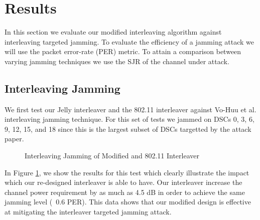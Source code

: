 \documentclass[sigconf]{acmart}
\begin{document}
\section{Results}
\label{sec:results}

In this section we evaluate our modified interleaving algorithm against interleaving targeted jamming. To evaluate the efficiency of a jamming attack we will use the packet error-rate (PER) metric. To attain a comparison between varying jamming techniques we use the SJR of the channel under attack.  

\subsection{Interleaving Jamming}

We first test our Jelly interleaver and the 802.11 interleaver against Vo-Huu et al. interleaving jamming technique. For this set of tests we jammed on DSCs 0, 3, 6, 9, 12, 15, and 18 since this is the largest subset of DSCs targetted by the attack paper. 

\begin{figure}[ht]
    \centering
    
    
    \caption{Interleaving Jamming of Modified and 802.11 Interleaver}
    \label{fig:interleaving_jamming}
\end{figure}

In Figure \ref{fig:interleaving_jamming}, we show the results for this test which clearly illustrate the impact which our re-designed interleaver is able to have. Our interleaver increase the channel power requirement by as much as 4.5 dB in order to achieve the same jamming level (~0.6 PER). This data shows that our modified design is effective at mitigating the interleaver targeted jamming attack. 
\end{document}
